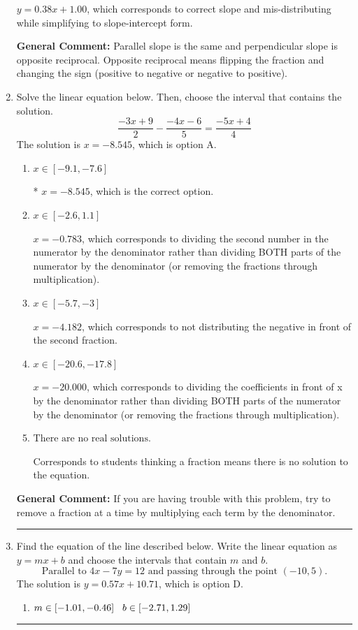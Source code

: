 \documentclass{extbook}[14pt]
\newcommand{\litem}[1]{\item #1

\rule{\textwidth}{0.4pt}}
\begin{document}
\begin{enumerate}
{\begin{enumerate}[label=\Alph*.]
 $y = 0.38x + 1.00$, which corresponds to correct slope and mis-distributing while simplifying to slope-intercept form.
\end{enumerate}

\textbf{General Comment:} Parallel slope is the same and perpendicular slope is opposite reciprocal. Opposite reciprocal means flipping the fraction and changing the sign (positive to negative or negative to positive).
}
\litem{
Solve the linear equation below. Then, choose the interval that contains the solution.
\[ \frac{-3x + 9}{2} - \frac{-4x -6}{5} = \frac{-5x + 4}{4} \]
The solution is \( x = -8.545 \), which is option A.\begin{enumerate}[label=\Alph*.]
\item \( x \in [-9.1, -7.6] \)

* $x = -8.545$, which is the correct option.
\item \( x \in [-2.6, 1.1] \)

 $x = -0.783$, which corresponds to dividing the second number in the numerator by the denominator rather than dividing BOTH parts of the numerator by the denominator (or removing the fractions through multiplication).
\item \( x \in [-5.7, -3] \)

 $x = -4.182$, which corresponds to not distributing the negative in front of the second fraction.
\item \( x \in [-20.6, -17.8] \)

 $x = -20.000$, which corresponds to dividing the coefficients in front of x by the denominator rather than dividing BOTH parts of the numerator by the denominator (or removing the fractions through multiplication).
\item \( \text{There are no real solutions.} \)

Corresponds to students thinking a fraction means there is no solution to the equation.
\end{enumerate}

\textbf{General Comment:} If you are having trouble with this problem, try to remove a fraction at a time by multiplying each term by the denominator.
}
\litem{
Find the equation of the line described below. Write the linear equation as $ y=mx+b $ and choose the intervals that contain $m$ and $b$.
\[ \text{Parallel to } 4 x - 7 y = 12 \text{ and passing through the point } (-10, 5). \]
The solution is \( y = 0.57x + 10.71 \), which is option D.\begin{enumerate}[label=\Alph*.]
\item \( m \in [-1.01, -0.46] \hspace*{3mm} b \in [-2.71, 1.29] \)


\end{enumerate}}
\end{enumerate}
\end{document}
